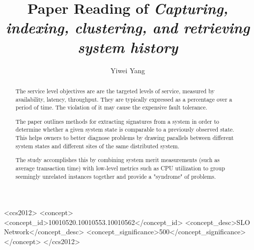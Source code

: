 \documentclass[acmlarge]{acmart}
\begin{document}
\title{Paper Reading of \textit{Capturing, indexing, clustering, and retrieving system history}}

\author{Yiwei Yang}

\renewcommand{\shortauthors}{Yiwei Yang}

\begin{abstract}
The service level objectives are are the targeted levels of service, measured by availability, latency, throughput. They are typically expressed as a percentage over a period of time. The violation of it may cause the expensive fault tolerance.

The paper \cite{cohen2005capturing} outlines methods for extracting signatures from a system in order to determine whether a given system state is comparable to a previously observed state. This helps owners to better diagnose problems by drawing parallels between different system states and different sites of the same distributed system.

The study accomplishes this by combining system merit measurements (such as average transaction time) with low-level metrics such as CPU utilization to group seemingly unrelated instances together and provide a "syndrome" of problems.
\end{abstract}

\begin{CCSXML}
  <ccs2012>
  <concept>
  <concept_id>10010520.10010553.10010562</concept_id>
  <concept_desc>SLO Network</concept_desc>
  <concept_significance>500</concept_significance>
  </concept>
  </ccs2012>
\end{CCSXML}
\end{document}
